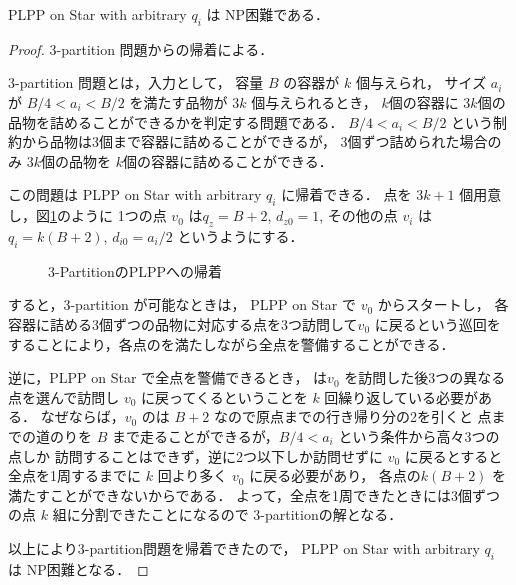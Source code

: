 \begin{theo}
	PLPP on Star with arbitrary $q_i$ は NP困難である．
\end{theo}
\begin{proof}
3-partition 問題からの帰着による．

3-partition 問題とは，入力として，
容量 $B$ の容器が $k$ 個与えられ，
サイズ $a_i$ が $B/4 < a_i < B/2$ を満たす品物が $3k$ 個与えられるとき，
$k$個の容器に $3k$個の品物を詰めることができるかを判定する問題である．
$B/4 < a_i < B/2$ という制約から品物は3個まで容器に詰めることができるが，
3個ずつ詰められた場合のみ $3k$個の品物を $k$個の容器に詰めることができる．

この問題は PLPP on Star with arbitrary $q_i$ に帰着できる．
点を $3k + 1$ 個用意し，図\ref{fig:star3partitionNPhard}のように
1つの点 $v_0$ は\shuki $q_z = B + 2$, $d_{z0} = 1$, 
その他の点 $v_i$ は\shuki $q_i = k(B + 2)$, $d_{i0} = a_i/2$ というようにする．

\begin{figure}
	\centering
	\caption{3-PartitionのPLPPへの帰着 \label{fig:star3partitionNPhard}}
\end{figure}

すると，3-partition が可能なときは，
PLPP on Star で $v_0$ からスタートし，
各容器に詰める3個ずつの品物に対応する点を3つ訪問して$v_0$ に戻るという巡回を
することにより，各点の\shuki を満たしながら全点を警備することができる．

逆に，PLPP on Star で全点を警備できるとき，
\server は$v_0$ を訪問した後3つの異なる点を選んで訪問し $v_0$ に戻ってくるということを
$k$ 回繰り返している必要がある．
なぜならば，$v_0$ の\shuki は $B + 2$ なので原点までの行き帰り分の2を引くと
点までの道のりを $B$ まで走ることができるが，$B/4 < a_i$ という条件から高々3つの点しか
訪問することはできず，逆に2つ以下しか訪問せずに $v_0$ に戻るとすると
全点を1周するまでに $k$ 回より多く $v_0$ に戻る必要があり，
各点の\shuki $k(B + 2)$ を満たすことができないからである．
よって，全点を1周できたときには3個ずつの点 $k$ 組に分割できたことになるので
3-partitionの解となる．

以上により3-partition問題を帰着できたので，
PLPP on Star with arbitrary $q_i$ は NP困難となる．
\end{proof}



